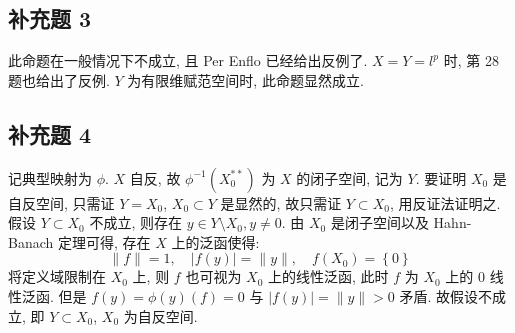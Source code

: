 \documentclass[\ROOT/main.tex]{subfiles}
\begin{document}
\subsection{补充题 3}
此命题在一般情况下不成立, 且 Per Enflo 已经给出反例了.
$X = Y = l^p$ 时, 第 28 题也给出了反例.
$Y$ 为有限维赋范空间时, 此命题显然成立.

\subsection{补充题 4} %
记典型映射为 $\phi$.
$X$ 自反, 故 $\phi^{-1} \left( X_0^{**} \right)$ 为 $X$ 的闭子空间, 记为 $Y$.
要证明 $X_0$ 是自反空间, 只需证 $Y = X_0$,
$X_0 \subset Y$ 是显然的, 故只需证 $Y \subset X_0$, 用反证法证明之.
假设 $Y \subset X_0$ 不成立, 则存在 $y \in Y \setminus X_0, y \neq 0$.
由 $X_0$ 是闭子空间以及 Hahn-Banach 定理可得, 存在 $X$ 上的泛函使得:
\[
    \| f \| = 1,
    \quad \left| f \left( y \right) \right| = \| y \|,
    \quad f \left( X_0 \right) = \left\{ 0 \right\}
\]
将定义域限制在 $X_0$ 上, 则 $f$ 也可视为 $X_0$ 上的线性泛函, 此时 $f$ 为 $X_0$ 上的 $0$ 线性泛函.
但是 $f \left( y \right) = \phi \left( y \right) \left( f \right) = 0$ 与 $\left| f \left( y \right) \right| = \| y \| > 0$ 矛盾.
故假设不成立, 即 $Y \subset X_0$, $X_0$ 为自反空间.
\end{document}
